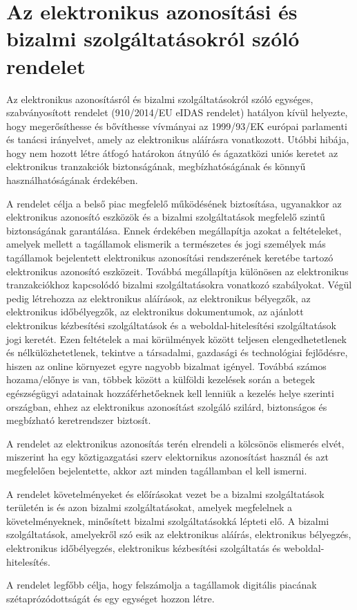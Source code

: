 \section{Az elektronikus azonosítási és bizalmi szolgáltatásokról szóló rendelet}

Az elektronikus azonosításról és bizalmi szolgáltatásokról szóló egységes, szabványosított rendelet (910/2014/EU eIDAS rendelet) hatályon kívül helyezte, hogy megerősíthesse és bővíthesse vívmányai az 1999/93/EK európai parlamenti és tanácsi irányelvet, amely az elektronikus aláírásra vonatkozott. Utóbbi hibája, hogy nem hozott létre átfogó határokon átnyúló és ágazatközi uniós keretet az elektronikus tranzakciók biztonságának, megbízhatóságának és könnyű használhatóságának érdekében.

A rendelet célja a belső piac megfelelő működésének biztosítása, ugyanakkor az elektronikus azonosító eszközök és a bizalmi szolgáltatások megfelelő szintű biztonságának garantálása. Ennek érdekében 	
megállapítja azokat a feltételeket, amelyek mellett a tagállamok elismerik a természetes és jogi személyek más tagállamok bejelentett elektronikus azonosítási rendszerének keretébe tartozó elektronikus azonosító eszközeit. Továbbá megállapítja különösen az elektronikus tranzakciókhoz kapcsolódó bizalmi szolgáltatásokra vonatkozó szabályokat. Végül pedig létrehozza az elektronikus aláírások, az elektronikus bélyegzők, az elektronikus időbélyegzők, az elektronikus dokumentumok, az ajánlott elektronikus kézbesítési szolgáltatások és a weboldal-hitelesítési szolgáltatások jogi keretét. Ezen feltételek a mai körülmények között teljesen elengedhetetlenek és nélkülözhetetlenek, tekintve a társadalmi, gazdasági és technológiai fejlődésre, hiszen az online környezet egyre nagyobb bizalmat igényel. Továbbá számos hozama/előnye is van, többek között a külföldi kezelések során a betegek egészségügyi adatainak hozzáférhetőeknek kell lenniük a kezelés helye szerinti országban, ehhez az elektronikus azonosítást szolgáló szilárd, biztonságos és megbízható keretrendszer biztosít.

A rendelet az elektronikus azonosítás terén elrendeli a kölcsönös elismerés elvét, miszerint ha egy köztigazgatási szerv elektornikus azonosítást használ és azt megfelelően bejelentette, akkor azt minden tagállamban el kell ismerni.

A rendelet követelményeket és előírásokat vezet be a bizalmi szolgáltatások területén is és azon bizalmi szolgáltatásokat, amelyek megfelelnek a követelményeknek, minősített bizalmi szolgáltatásokká lépteti elő. A bizalmi szolgáltatások, amelyekről szó esik az elektronikus aláírás, elektronikus bélyegzés, elektronikus időbélyegzés, elektronikus kézbesítési szolgáltatás és weboldal-hitelesítés.

A rendelet legfőbb célja, hogy felszámolja a tagállamok digitális piacának szétaprózódottságát és egy egységet hozzon létre. \cite{eIDAS}
